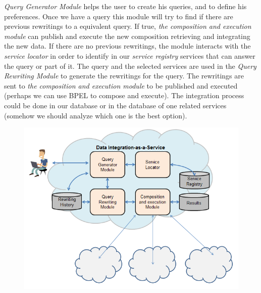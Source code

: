 \documentclass[12pt,a4paper,oneside]{article}
\begin{document}
\textit{Query Generator Module} helps the user to create his queries, and to define his preferences. 
Once we have a query this module will try to find if there are previous rewritings to a equivalent query. 
If true, \textit{the composition and execution module} can publish and execute the new composition retrieving and integrating the new data.
If there are no previous rewritings, the module interacts with the \textit{service locator} in order to identify in our \textit{service registry} services that can answer the query or part of it.
The query and the selected services are used in the \textit{Query Rewriting Module} to generate the rewritings for the query. 
The rewritings are sent to \textit{the composition and execution module} to be published and executed (perhaps we can use BPEL to compose and execute).
The integration process could be done in our database or in the database of one related services (somehow we should analyze which one is the best option).

\begin{figure}[h]
\center
\includegraphics[scale=0.8]{arch.PNG} 
\end{figure}
\end{document}
